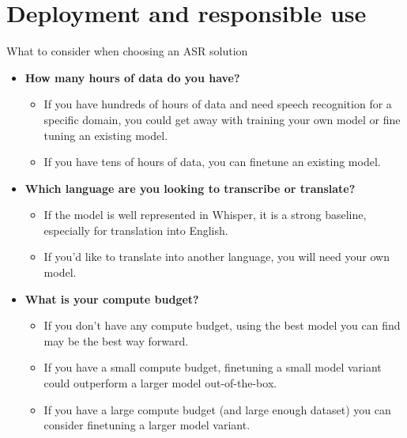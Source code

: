 \section{Deployment and responsible use}

\begin{frame}[allowframebreaks]{What to consider when choosing an ASR solution}
  \begin{itemize}
    \item \textbf{How many hours of data do you have?}
    \begin{itemize}
      \item If you have hundreds of hours of data and need speech recognition for a specific domain, you could get away with training your own model or fine tuning an existing model.
      \item If you have tens of hours of data, you can finetune an existing model.
    \end{itemize}
    \item \textbf{Which language are you looking to transcribe or translate?}
    \begin{itemize}
      \item If the model is well represented in Whisper, it is a strong baseline, especially for translation into English.
      \item If you'd like to translate into another language, you will need your own model.
    \end{itemize}
    \framebreak
    \item \textbf{What is your compute budget?}
    \begin{itemize}
      \item If you don't have any compute budget, using the best model you can find may be the best way forward.
      \item If you have a small compute budget, finetuning a small model variant could outperform a larger model out-of-the-box.
      \item If you have a large compute budget (and large enough dataset) you can consider finetuning a larger model variant.
    \end{itemize}
  \end{itemize}
\end{frame}

